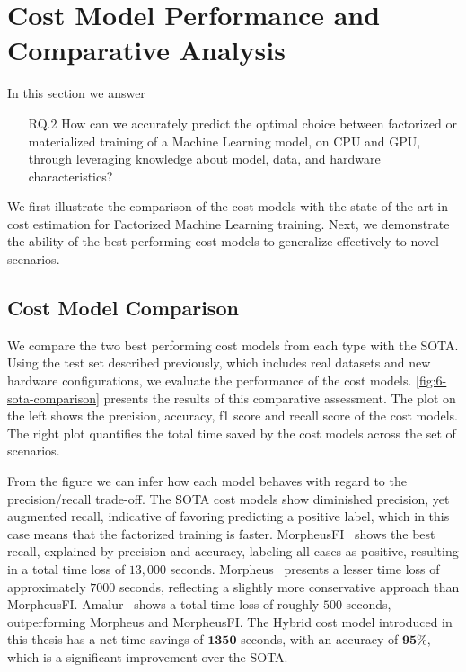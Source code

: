 \section{Cost Model Performance and Comparative Analysis}
\label{sec:eval-model-evaluation}

In this section we answer
\begin{itemize}
  \item[RQ.2] How can we accurately predict the optimal choice between factorized or materialized training of a Machine Learning model, on CPU and GPU, through leveraging knowledge about model, data, and hardware characteristics?
\end{itemize}

We first illustrate the comparison of the cost models with the state-of-the-art in cost estimation for Factorized Machine Learning training. Next, we demonstrate the ability of the best performing cost models to generalize effectively to novel scenarios.

\subsection{Cost Model Comparison}
\label{subsec:6-sota-comparison}
We compare the two best performing cost models from each type with the SOTA. Using the test set described previously, which includes real datasets and new hardware configurations, we evaluate the performance of the cost models. \autoref{fig:6-sota-comparison} presents the results of this comparative assessment. The plot on the left shows the precision, accuracy, f1 score and recall score of the cost models. The right plot quantifies the total time saved by the cost models across the set of scenarios.

From the figure we can infer how each model behaves with regard to the precision/recall trade-off. The SOTA cost models show diminished precision, yet augmented recall, indicative of favoring predicting a positive label, which in this case means that the factorized training is faster. MorpheusFI~\cite{MorpheusFI} shows the best recall, explained by precision and accuracy, labeling all cases as positive, resulting in a total time loss of $13,000$ seconds. Morpheus~\cite{orion_learning_gen_lin_models} presents a lesser time loss of approximately $7000$ seconds, reflecting a slightly more conservative approach than MorpheusFI. Amalur~\cite{amalur} shows a total time loss of roughly $500$ seconds, outperforming Morpheus and MorpheusFI. The Hybrid cost model introduced in this thesis has a net time savings of $\mathbf{1350}$ seconds, with an accuracy of $\mathbf{95\%}$, which is a significant improvement over the SOTA.

